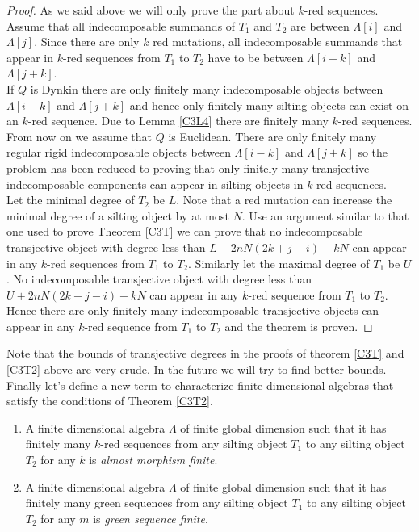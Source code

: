 \begin{proof}
\indent As we said above we will only prove the part about $k$-red sequences. Assume that all indecomposable summands of $T_1$ and $T_2$ are between $\Lambda[i]$ and $\Lambda[j]$. Since there are only $k$ red mutations, all indecomposable summands that appear in $k$-red sequences from $T_1$ to $T_2$ have to be between $\Lambda[i-k]$ and $\Lambda[j+k]$.\\ 
\indent If $Q$ is Dynkin there are only finitely many indecomposable objects between $\Lambda[i-k]$ and $\Lambda[j+k]$ and hence only finitely many silting objects can exist on an $k$-red sequence. Due to Lemma \ref{C3L4} there are finitely many $k$-red sequences. 
\indent From now on we assume that $Q$ is Euclidean. There are only finitely many regular rigid indecomposable objects between $\Lambda[i-k]$ and $\Lambda[j+k]$ so the problem has been reduced to proving that only finitely many transjective indecomposable components can appear in silting objects in $k$-red sequences.\\
\indent Let the minimal degree of $T_2$ be $L$. Note that a red mutation can increase the minimal degree of a silting object by at most $N$. Use an argument similar to that one used to prove Theorem \ref{C3T} we can prove that no indecomposable transjective object with degree less than $L-2nN(2k+j-i)-kN$ can appear in any $k$-red sequences from $T_1$ to $T_2$. Similarly let the maximal degree of $T_1$ be $U$. No indecomposable transjective object with degree less than $U+2nN(2k+j-i)+kN$ can appear in any $k$-red sequence from $T_1$ to $T_2$. Hence there are only finitely many indecomposable transjective objects can appear in any $k$-red sequence from $T_1$ to $T_2$ and the theorem is proven.
\end{proof}
\indent Note that the bounds of transjective degrees in the proofs of theorem \ref{C3T} and \ref{C3T2} above are very crude. In the future we will try to find better bounds.\\
\indent Finally let's define a new term to characterize finite dimensional algebras that satisfy the conditions of Theorem \ref{C3T2}.\\
\begin{definition}
\begin{enumerate}
\item A finite dimensional algebra $\Lambda$ of finite global dimension such that it has finitely many $k$-red sequences from any silting object $T_1$ to any silting object $T_2$ for any $k$ is \textit{almost morphism finite}.
\item A finite dimensional algebra $\Lambda$ of finite global dimension such that it has finitely many green sequences from any silting object $T_1$ to any silting object $T_2$ for any $m$ is \textit{green sequence finite}.
\end{enumerate}
\end{definition}
